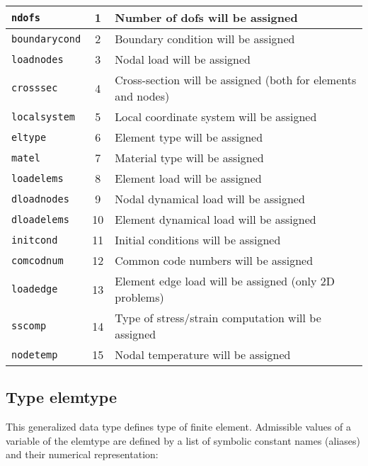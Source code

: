 \begin{center}
\begin{tabular}{|l|c|l|}
\hline
{\tt ndofs} & 1 & Number of dofs will be assigned
\\ \hline
{\tt boundarycond} & 2 & Boundary condition will be assigned
\\ \hline
{\tt loadnodes} & 3 & Nodal load will be assigned
\\ \hline
{\tt crosssec} & 4 & Cross-section will be assigned (both for elements and nodes)
\\ \hline
{\tt localsystem} & 5 & Local coordinate system will be assigned
\\ \hline
{\tt eltype} & 6 & Element type will be assigned
\\ \hline
{\tt matel} & 7 & Material type will be assigned
\\ \hline
{\tt loadelems} & 8 & Element load will be assigned
\\ \hline
{\tt dloadnodes} & 9 & Nodal dynamical load will be assigned
\\ \hline
{\tt dloadelems} & 10 & Element dynamical load will be assigned
\\ \hline
{\tt initcond} & 11 & Initial conditions will be assigned
\\ \hline
{\tt comcodnum} & 12 & Common code numbers will be assigned
\\ \hline
{\tt loadedge} & 13 & Element edge load will be assigned (only 2D problems)
\\ \hline
{\tt sscomp} & 14 & Type of stress/strain computation will be assigned
\\ \hline
{\tt nodetemp} & 15 & Nodal temperature will be assigned
\\ \hline
\end{tabular}
\end{center}


\subsection{Type {\sf elemtype}}
\label{sectelemtype}

This generalized data type defines type of finite element.
Admissible values of a variable of the {\sf elemtype} are defined by a list of symbolic constant names (aliases)
and their numerical representation:

